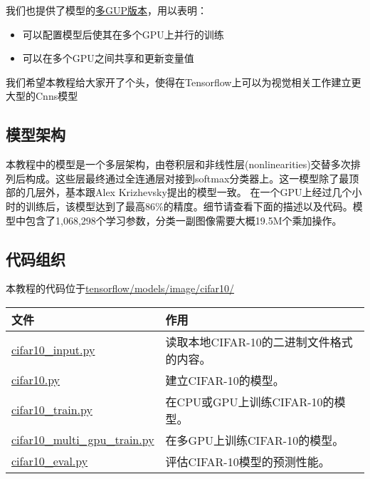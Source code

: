 我们也提供了模型的\href{https://www.tensorflow.org/tutorials/deep_cnn#training_a_model_using_multiple_gpu_cards}{多GUP版本}，用以表明：
\begin{itemize}
\item 可以配置模型后使其在多个GPU上并行的训练
\item 可以在多个GPU之间共享和更新变量值
\end{itemize}

我们希望本教程给大家开了个头，使得在Tensorflow上可以为视觉相关工作建立更大型的Cnns模型
\subsection{模型架构}
本教程中的模型是一个多层架构，由卷积层和非线性层(nonlinearities)交替多次排列后构成。这些层最终通过全连通层对接到softmax分类器上。这一模型除了最顶部的几层外，基本跟Alex Krizhevsky提出的模型一致。
在一个GPU上经过几个小时的训练后，该模型达到了最高86\%的精度。细节请查看下面的描述以及代码。模型中包含了1,068,298个学习参数，分类一副图像需要大概19.5M个乘加操作。

\subsection{代码组织}
本教程的代码位于\href{https://www.tensorflow.org/code/tensorflow_models/tutorials/image/cifar10/}{tensorflow/models/image/cifar10/}
\begin{table*}
\begin{tabular}{|p{6cm}|p{8cm}|}
	\hline
	文件&作用\\
	\hline
	\href{https://www.tensorflow.org/code/tensorflow_models/tutorials/image/cifar10/cifar10_input.py}{cifar10\_input.py}&读取本地CIFAR-10的二进制文件格式的内容。\\
	\hline
	\href{https://www.tensorflow.org/code/tensorflow_models/tutorials/image/cifar10/cifar10.py}{cifar10.py}&建立CIFAR-10的模型。\\
	\hline
	\href{https://www.tensorflow.org/code/tensorflow_models/tutorials/image/cifar10/cifar10_train.py}{cifar10\_train.py}&在CPU或GPU上训练CIFAR-10的模型。\\
	\hline
	\href{https://www.tensorflow.org/code/tensorflow_models/tutorials/image/cifar10/cifar10_multi_gpu_train.py}{cifar10\_multi\_gpu\_train.py}&在多GPU上训练CIFAR-10的模型。\\
	\hline
	\href{https://www.tensorflow.org/code/tensorflow_models/tutorials/image/cifar10/cifar10_eval.py}{cifar10\_eval.py}&评估CIFAR-10模型的预测性能。\\
	\hline
\end{tabular}
\end{table*}
	
